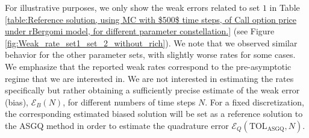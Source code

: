 For illustrative purposes, we only show the weak errors related to set $1$ in Table \ref{table:Reference solution, using MC with $500$ time steps, of Call option price under rBergomi model, for different parameter constellation.} (see Figure \ref{fig:Weak_rate_set1_set_2_without_rich}). We note that we observed similar behavior for the other parameter sets, with slightly worse rates for some cases. We emphasize that the reported weak rates correspond to the pre-asymptotic regime that we are interested in. We are not interested in estimating the rates specifically but rather obtaining  a sufficiently precise estimate of the weak error (bias), $\mathcal{E}_B(N)$, for different  numbers of time steps $N$.  For a fixed discretization, the corresponding estimated biased solution will be set as a reference solution to the  ASGQ method  in order to estimate the quadrature error $\mathcal{E}_Q(\text{TOL}_{\text{ASGQ}},N)$.	
\FloatBarrier

